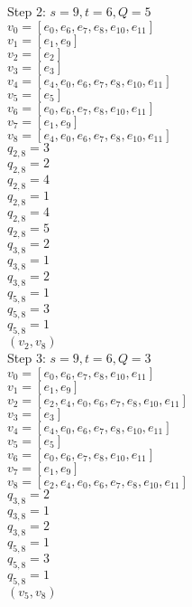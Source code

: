 Step 2:
$s=9,t=6,Q=5$\\
$v_{0}=[e_{0},e_{6},e_{7},e_{8},e_{10},e_{11}]$\\
$v_{1}=[e_{1},e_{9}]$\\
$v_{2}=[e_{2}]$\\
$v_{3}=[e_{3}]$\\
$v_{4}=[e_{4},e_{0},e_{6},e_{7},e_{8},e_{10},e_{11}]$\\
$v_{5}=[e_{5}]$\\
$v_{6}=[e_{0},e_{6},e_{7},e_{8},e_{10},e_{11}]$\\
$v_{7}=[e_{1},e_{9}]$\\
$v_{8}=[e_{4},e_{0},e_{6},e_{7},e_{8},e_{10},e_{11}]$\\
$q_{2,8}=3$\\
$q_{2,8}=2$\\
$q_{2,8}=4$\\
$q_{2,8}=1$\\
$q_{2,8}=4$\\
$q_{2,8}=5$\\
$q_{3,8}=2$\\
$q_{3,8}=1$\\
$q_{3,8}=2$\\
$q_{5,8}=1$\\
$q_{5,8}=3$\\
$q_{5,8}=1$\\
$(v_{2},v_{8})$\\


Step 3:
$s=9,t=6,Q=3$\\
$v_{0}=[e_{0},e_{6},e_{7},e_{8},e_{10},e_{11}]$\\
$v_{1}=[e_{1},e_{9}]$\\
$v_{2}=[e_{2},e_{4},e_{0},e_{6},e_{7},e_{8},e_{10},e_{11}]$\\
$v_{3}=[e_{3}]$\\
$v_{4}=[e_{4},e_{0},e_{6},e_{7},e_{8},e_{10},e_{11}]$\\
$v_{5}=[e_{5}]$\\
$v_{6}=[e_{0},e_{6},e_{7},e_{8},e_{10},e_{11}]$\\
$v_{7}=[e_{1},e_{9}]$\\
$v_{8}=[e_{2},e_{4},e_{0},e_{6},e_{7},e_{8},e_{10},e_{11}]$\\
$q_{3,8}=2$\\
$q_{3,8}=1$\\
$q_{3,8}=2$\\
$q_{5,8}=1$\\
$q_{5,8}=3$\\
$q_{5,8}=1$\\
$(v_{5},v_{8})$\\


